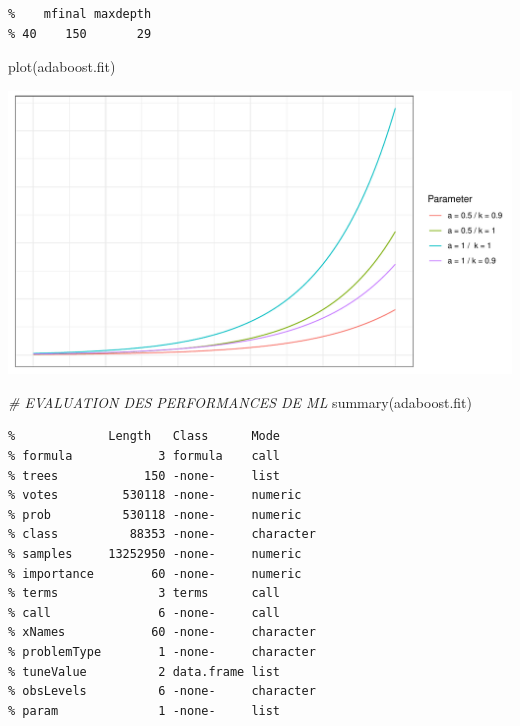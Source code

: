 \documentclass[
]{article}
\newenvironment{Shaded}{\begin{snugshade}}{\end{snugshade}}
\newcommand{\CommentTok}[1]{\textcolor[rgb]{0.56,0.35,0.01}{\textit{#1}}}
\newcommand{\FunctionTok}[1]{\textcolor[rgb]{0.00,0.00,0.00}{#1}}
\newcommand{\NormalTok}[1]{#1}
\begin{document}
\begin{verbatim}
%    mfinal maxdepth
% 40    150       29
\end{verbatim}

\begin{Shaded}
\begin{Highlighting}[]
\FunctionTok{plot}\NormalTok{(adaboost.fit)}
\end{Highlighting}
\end{Shaded}

\includegraphics{Learning_R_files/figure-latex/unnamed-chunk-9-1.pdf}

\begin{Shaded}
\begin{Highlighting}[]
\CommentTok{\# EVALUATION DES PERFORMANCES DE ML}
\FunctionTok{summary}\NormalTok{(adaboost.fit)}
\end{Highlighting}
\end{Shaded}

\begin{verbatim}
%             Length   Class      Mode     
% formula            3 formula    call     
% trees            150 -none-     list     
% votes         530118 -none-     numeric  
% prob          530118 -none-     numeric  
% class          88353 -none-     character
% samples     13252950 -none-     numeric  
% importance        60 -none-     numeric  
% terms              3 terms      call     
% call               6 -none-     call     
% xNames            60 -none-     character
% problemType        1 -none-     character
% tuneValue          2 data.frame list     
% obsLevels          6 -none-     character
% param              1 -none-     list
\end{verbatim}
\end{document}
